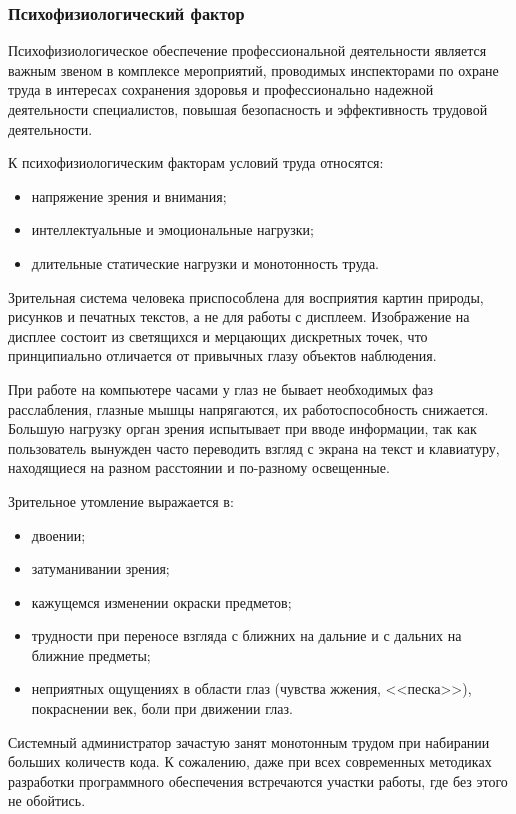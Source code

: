 \subsubsection{Психофизиологический фактор}

Психофизиологическое обеспечение профессиональной деятельности является важным звеном в комплексе мероприятий, проводимых инспекторами по охране труда в интересах сохранения здоровья и профессионально надежной деятельности специалистов, повышая безопасность и эффективность трудовой деятельности.

К психофизиологическим факторам условий труда относятся:

\begin{itemize}
  \item напряжение зрения и внимания;
  \item интеллектуальные и эмоциональные нагрузки;
  \item длительные статические нагрузки и монотонность труда.
\end{itemize}

Зрительная система человека приспособлена для восприятия картин природы, рисунков и печатных текстов, а не для работы с дисплеем. Изображение на дисплее состоит из светящихся и мерцающих дискретных точек, что принципиально отличается от привычных глазу объектов наблюдения.

При работе на компьютере часами у глаз не бывает необходимых фаз расслабления, глазные мышцы напрягаются, их работоспособность снижается. Большую нагрузку орган зрения испытывает при вводе информации, так как пользователь вынужден часто переводить взгляд с экрана на текст и клавиатуру, находящиеся на разном расстоянии и по-разному освещенные.

Зрительное утомление выражается в:

\begin{itemize}
  \item двоении;
  \item затуманивании зрения;
  \item кажущемся изменении окраски предметов;
  \item трудности при переносе взгляда с ближних на дальние и с дальних на ближние предметы;
  \item неприятных ощущениях в области глаз (чувства жжения, <<песка>>), покраснении век, боли при движении глаз.
\end{itemize}

Системный администратор зачастую занят монотонным трудом при набирании больших количеств кода. К сожалению, даже при всех современных методиках разработки программного обеспечения встречаются участки работы, где без этого не обойтись.

